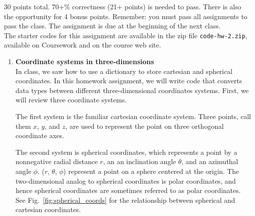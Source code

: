 \documentclass{article}
\newcounter{points}
\newcommand\setpoints[1]{\addtocounter{points}{#1}(#1 points)}
\begin{document}
\pagestyle{fancy}

30 points total.  70+\% correctness (21+ points) is needed to pass.  There is also the opportunity for 4 bonus points.  Remember: you must pass all assignments to pass the class.  The assignment is due at the beginning of the next class. \\

The starter codes for this assignment are available in the zip file \texttt{code-hw-2.zip}, available on Coursework and on the course web site.

\begin{enumerate}



\item \textbf{Coordinate systems in three-dimensions} \\
In class, we saw how to use a dictionary to store cartesian and spherical coordinates.  In this homework assignment, we will write code that converts data types between different three-dimensional coordinates systems.  First, we will review three coordinate systems.

The first system is the familiar cartesian coordinate system.  Three points, call them $x$, $y$, and $z$, are used to represent the point on three orthogonal coordinate axes.

The second system is spherical coordinates, which represents a point by a nonnegative radial distance $r$, an an inclination angle $\theta$, and an azimuthal angle $\phi$.  ($r$, $\theta$, $\phi$) represent a point on a sphere centered at the origin.  The two-dimensional analog to spherical coordinates is polar coordinates, and hence spherical coordinates are sometimes referred to as polar coordinates.  See Fig.~\ref{fig:spherical_coords} for the relationship between spherical and cartesian coordinates.


\end{enumerate}
\end{document}
